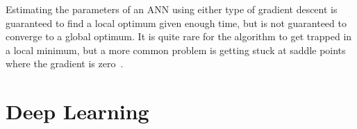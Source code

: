 

Estimating the parameters of an \ac{ANN} using either type of gradient descent is guaranteed to find a local optimum given enough time, but is not guaranteed to converge to a global optimum.
It is quite rare for the algorithm to get trapped in a local minimum, but a more common problem is getting stuck at saddle points where the gradient is zero~\autocite[438]{lecun2015}.

\section{Deep Learning} \label{sec:deep-learning}

